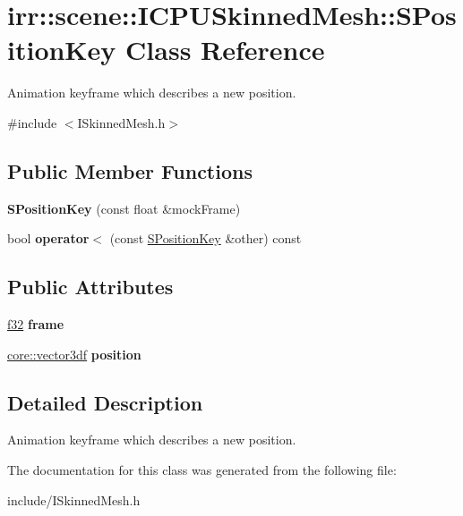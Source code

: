 \hypertarget{classirr_1_1scene_1_1ICPUSkinnedMesh_1_1SPositionKey}{}\section{irr\+:\+:scene\+:\+:I\+C\+P\+U\+Skinned\+Mesh\+:\+:S\+Position\+Key Class Reference}
\label{classirr_1_1scene_1_1ICPUSkinnedMesh_1_1SPositionKey}


Animation keyframe which describes a new position.  




{\ttfamily \#include $<$I\+Skinned\+Mesh.\+h$>$}

\subsection*{Public Member Functions}
\begin{DoxyCompactItemize}
\item 
{\bfseries S\+Position\+Key} (const float \&mock\+Frame)\hypertarget{classirr_1_1scene_1_1ICPUSkinnedMesh_1_1SPositionKey_ada1dd4058ad1cef0e96eacbebaa7ec1b}{}\label{classirr_1_1scene_1_1ICPUSkinnedMesh_1_1SPositionKey_ada1dd4058ad1cef0e96eacbebaa7ec1b}

\item 
bool {\bfseries operator$<$} (const \hyperlink{classirr_1_1scene_1_1ICPUSkinnedMesh_1_1SPositionKey}{S\+Position\+Key} \&other) const \hypertarget{classirr_1_1scene_1_1ICPUSkinnedMesh_1_1SPositionKey_a67c2e656f7ab64dfd41c9d6662eae1a4}{}\label{classirr_1_1scene_1_1ICPUSkinnedMesh_1_1SPositionKey_a67c2e656f7ab64dfd41c9d6662eae1a4}

\end{DoxyCompactItemize}
\subsection*{Public Attributes}
\begin{DoxyCompactItemize}
\item 
\hyperlink{namespaceirr_a0277be98d67dc26ff93b1a6a1d086b07}{f32} {\bfseries frame}\hypertarget{classirr_1_1scene_1_1ICPUSkinnedMesh_1_1SPositionKey_a081c4d9dfefc847fae14aabc0db0d1cf}{}\label{classirr_1_1scene_1_1ICPUSkinnedMesh_1_1SPositionKey_a081c4d9dfefc847fae14aabc0db0d1cf}

\item 
\hyperlink{namespaceirr_1_1core_a06f169d08b5c429f5575acb7edbad811}{core\+::vector3df} {\bfseries position}\hypertarget{classirr_1_1scene_1_1ICPUSkinnedMesh_1_1SPositionKey_a4e104efe6939e0679fc2a8a8aa0f6157}{}\label{classirr_1_1scene_1_1ICPUSkinnedMesh_1_1SPositionKey_a4e104efe6939e0679fc2a8a8aa0f6157}

\end{DoxyCompactItemize}


\subsection{Detailed Description}
Animation keyframe which describes a new position. 

The documentation for this class was generated from the following file\+:\begin{DoxyCompactItemize}
\item 
include/I\+Skinned\+Mesh.\+h\end{DoxyCompactItemize}
